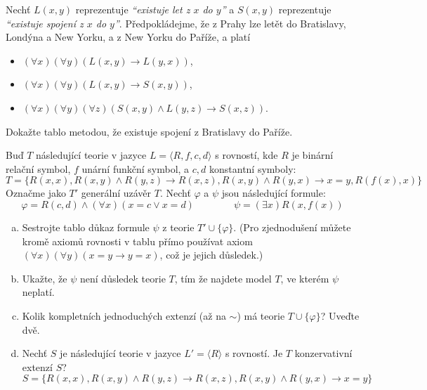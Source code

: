 \begin{problem} 
    
    Nechť $L(x,y)$ reprezentuje \emph{``existuje let z $x$ do $y$''} a $S(x,y)$ reprezentuje \emph{``existuje spojení z $x$ do $y$''}. Předpokládejme, že z Prahy lze letět do Bratislavy, Londýna a New Yorku, a z New Yorku do Paříže, a platí
    \begin{itemize}  
        \item $(\forall x)(\forall y)(L(x,y) \to L(y,x))$,
        \item $(\forall x)(\forall y)(L(x,y)\to S(x,y))$,
        \item $(\forall x)(\forall y)(\forall z)(S(x,y)\wedge L(y,z)\to S(x,z))$.
    \end{itemize}
    Dokažte tablo metodou, že existuje spojení z Bratislavy do Paříže.

\end{problem}



\begin{problem} 

    Buď $T$ následující teorie v jazyce $L=\langle R,f,c,d\rangle$ s rovností, kde $R$ je binární relační symbol,  $f$ unární funkční symbol, a $c,d$ konstantní symboly:
    $$
    T=\{R(x,x),R(x,y)\wedge R(y,z)\to R(x,z),R(x,y)\wedge R(y,x)\to x=y,R(f(x),x)\}
    $$
    Označme jako $T'$ generální uzávěr $T$. Nechť $\varphi$ a $\psi$ jsou následující formule:
    $$
    \varphi = R(c,d) \wedge (\forall x)(x=c\vee x=d)\qquad\qquad
    \psi = (\exists x)R(x,f(x))
    $$
    \begin{enumerate}[(a)]
        \item Sestrojte tablo důkaz formule $\psi$ z teorie $T'\cup\{\varphi\}$. (Pro zjednodušení můžete kromě axiomů rovnosti v tablu přímo používat axiom $(\forall x)(\forall y)(x=y\to y=x)$, což je jejich důsledek.)
        \item Ukažte, že $\psi$ není důsledek teorie $T$, tím že najdete model $T$, ve kterém $\psi$ neplatí.
        \item Kolik kompletních jednoduchých extenzí (až na $\sim$) má teorie $T\cup \{\varphi\}$? Uveďte dvě.
        \item Nechť $S$ je následující teorie v jazyce $L'=\langle R\rangle$ s rovností. Je $T$ konzervativní extenzí $S$?
        $$S=\{R(x,x),R(x,y)\wedge R(y,z)\to R(x,z),R(x,y)\wedge R(y,x)\to x=y\}$$     
    \end{enumerate}

\end{problem}


